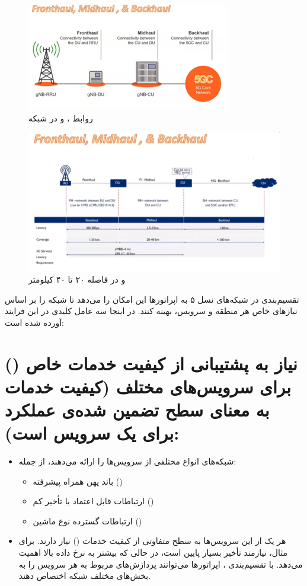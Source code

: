 \documentclass[landscape, 12pt]{report}
\begin{document}
\begin{figure}[ht]
	\centering
	\includegraphics[width=.6\linewidth]{Pic/Fronthaul_Midhaul_Backhaul}
	\caption{ روابط
		،
		و 
		در شبکه
	}
	\label{fig:Fronthaul_Midhaul_Backhaul}
\end{figure}

\begin{figure}[ht]
	\centering
	\includegraphics[width=.6\linewidth]{Pic/DUI}
	\caption{   و     در فاصله ۲۰ تا ۴۰ کیلومتر
	}
	\label{fig:Fronthaul_Midhaul_Backhaul}
\end{figure}

تقسیم‌بندی  در شبکه‌های نسل ۵ به اپراتورها این امکان را می‌دهد تا شبکه را بر اساس نیازهای خاص هر منطقه و سرویس، بهینه کنند. در اینجا سه عامل کلیدی در این فرایند آورده شده است:

\section*{ نیاز به پشتیبانی از کیفیت خدمات خاص () برای سرویس‌های مختلف (کیفیت خدمات به معنای سطح تضمین شده‌ی عملکرد برای یک سرویس است):}

\begin{itemize}
    \item شبکه‌های
      انواع مختلفی از سرویس‌ها را ارائه می‌دهند، از جمله:
    \begin{itemize}
        \item باند پهن همراه پیشرفته ()
        \item ارتباطات قابل اعتماد با تأخیر کم ()
        \item ارتباطات گسترده نوع ماشین ()
    \end{itemize}
    \item هر یک از این سرویس‌ها به سطح متفاوتی از کیفیت خدمات () نیاز دارند. برای مثال،  نیازمند تأخیر بسیار پایین است، در حالی که  بیشتر به نرخ داده بالا اهمیت می‌دهد. با تقسیم‌بندی ، اپراتورها می‌توانند پردازش‌های مربوط به هر سرویس را به بخش‌های مختلف شبکه اختصاص دهند.
\end{itemize}
\end{document}
